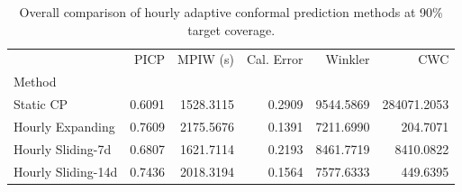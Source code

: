 \begin{table}
\caption{Overall comparison of hourly adaptive conformal prediction methods at 90\% target coverage.}
\label{tab:t5b1_hourly_overall}
\begin{tabular}{lrrrrr}
\toprule
 & PICP & MPIW (s) & Cal. Error & Winkler & CWC \\
Method &  &  &  &  &  \\
\midrule
Static CP & 0.6091 & 1528.3115 & 0.2909 & 9544.5869 & 284071.2053 \\
Hourly Expanding & 0.7609 & 2175.5676 & 0.1391 & 7211.6990 & 204.7071 \\
Hourly Sliding-7d & 0.6807 & 1621.7114 & 0.2193 & 8461.7719 & 8410.0822 \\
Hourly Sliding-14d & 0.7436 & 2018.3194 & 0.1564 & 7577.6333 & 449.6395 \\
\bottomrule
\end{tabular}
\end{table}
